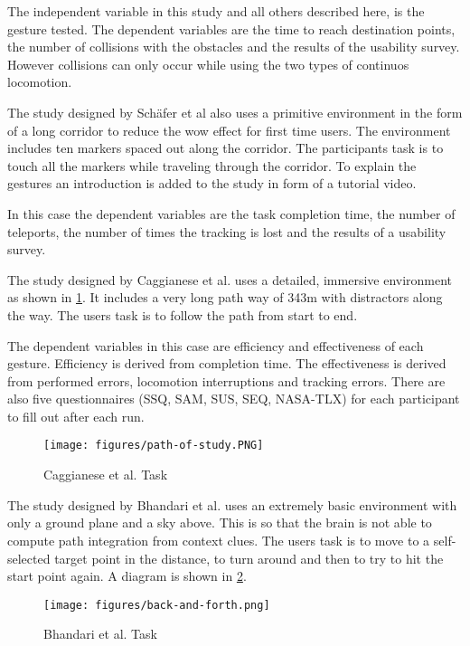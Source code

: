 The independent variable in this study and all others described here, is the gesture tested. The dependent variables are the time to reach destination points, the number of collisions with the obstacles and the results of the usability survey. 
However collisions can only occur while using the two types of continuos locomotion. 



The study designed by Schäfer et al \cite{Schafer2021} also uses a primitive environment in the form of a long corridor to reduce the wow effect for first time users. The environment includes ten markers spaced out along the corridor. The participants task is to touch all the markers while traveling through the corridor. To explain the gestures an introduction is added to the study in form of a tutorial video.

In this case the dependent variables are the task completion time, the number of teleports, the number of times the tracking is lost and the results of a usability survey.


The study designed by Caggianese et al. \cite{Caggianese} uses a detailed, immersive environment as shown in \ref{fig:path}. It includes a very long path way of 343m with distractors along the way. The users task is to follow the path from start to end. 

The dependent variables in this case are efficiency and effectiveness of each gesture. Efficiency is derived from completion time. The effectiveness is derived from performed errors, locomotion interruptions and tracking errors. There are also five questionnaires (SSQ, SAM, SUS, SEQ, NASA-TLX) for each participant to fill out after each run.

\begin{figure}[htb]
  \centering
  \texttt{[image: figures/path-of-study.PNG]}
  \caption{Caggianese et al. \cite{Caggianese} Task}
  \label{fig:path}
\end{figure}


The study designed by Bhandari et al. \cite{Bhandari} uses an extremely basic environment with only a ground plane and a sky above. This is so that the brain is not able to compute path integration from context clues. The users task is to move to a self-selected target point in the distance, to turn around and then to try to hit the start point again. A diagram is shown in \ref{fig:backAndForth}.

\begin{figure}[htb]
  \centering
  \texttt{[image: figures/back-and-forth.png]}
  \caption{Bhandari et al. \cite{Bhandari} Task}
  \label{fig:backAndForth}
\end{figure}

